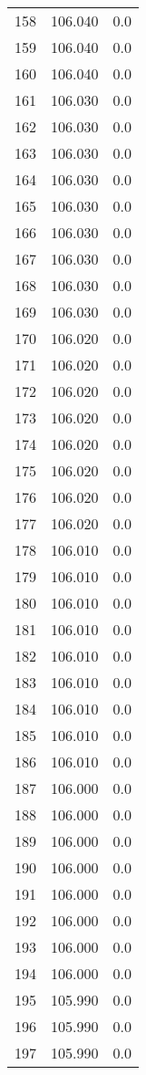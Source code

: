 \begin{tabular}{lrr}
158 &  106.040 &   0.0 \\
159 &  106.040 &   0.0 \\
160 &  106.040 &   0.0 \\
161 &  106.030 &   0.0 \\
162 &  106.030 &   0.0 \\
163 &  106.030 &   0.0 \\
164 &  106.030 &   0.0 \\
165 &  106.030 &   0.0 \\
166 &  106.030 &   0.0 \\
167 &  106.030 &   0.0 \\
168 &  106.030 &   0.0 \\
169 &  106.030 &   0.0 \\
170 &  106.020 &   0.0 \\
171 &  106.020 &   0.0 \\
172 &  106.020 &   0.0 \\
173 &  106.020 &   0.0 \\
174 &  106.020 &   0.0 \\
175 &  106.020 &   0.0 \\
176 &  106.020 &   0.0 \\
177 &  106.020 &   0.0 \\
178 &  106.010 &   0.0 \\
179 &  106.010 &   0.0 \\
180 &  106.010 &   0.0 \\
181 &  106.010 &   0.0 \\
182 &  106.010 &   0.0 \\
183 &  106.010 &   0.0 \\
184 &  106.010 &   0.0 \\
185 &  106.010 &   0.0 \\
186 &  106.010 &   0.0 \\
187 &  106.000 &   0.0 \\
188 &  106.000 &   0.0 \\
189 &  106.000 &   0.0 \\
190 &  106.000 &   0.0 \\
191 &  106.000 &   0.0 \\
192 &  106.000 &   0.0 \\
193 &  106.000 &   0.0 \\
194 &  106.000 &   0.0 \\
195 &  105.990 &   0.0 \\
196 &  105.990 &   0.0 \\
197 &  105.990 &   0.0 \\

\end{tabular}
